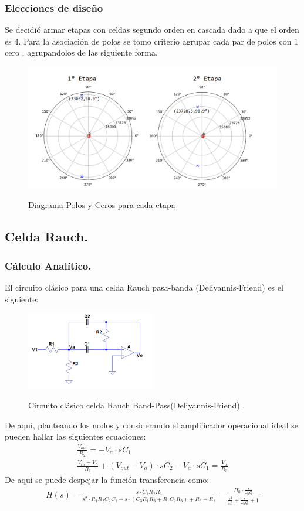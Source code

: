 \subsubsection{Elecciones de diseño}
Se decidió armar etapas con celdas segundo orden en cascada dado a que el orden es 4.
Para la asociación de polos se tomo criterio agrupar cada par de polos con 1 cero , agrupandolos de las siguiente forma.
\begin{figure}[H]
	\centering
	\includegraphics[width=\textwidth]{Imagenes-Ej2/UnionCeros.png}
	\label{fig:CeroPoleUnion}
	\caption{Diagrama Polos y Ceros para cada etapa}
\end{figure}

\subsection{Celda Rauch.}
\subsubsection{Cálculo Analítico.}
El circuito clásico para una celda 	Rauch pasa-banda (Deliyannis-Friend) es el siguiente:
\begin{figure}[H]
	\centering
	\includegraphics[width=0.5\textwidth]{Imagenes-Ej2/rauchoriginal.PNG}
	\label{fig:graph}
	\caption{Circuito clásico celda Rauch Band-Pass(Deliyannis-Friend) .}
\end{figure}
De aquí, planteando los nodos y considerando el amplificador operacional ideal se pueden hallar las siguientes ecuaciones:
\begin{align}
\frac{V_{out}}{R_2}=-V_a\cdot sC_1\\ 
\frac{V_{in}-V_a}{R_1}+(V_{out}-V_a)\cdot sC_2 -V_a \cdot sC_1 = \frac{V_a}{R_3}
\end{align}
De aqui se puede despejar la función transferencia como:
\begin{align}
H(s)=\frac{s \cdot C_1R_2R_3}{s^2\cdot R_1R_2C_2C_1+s\cdot (C_3R_1R_3+R_1C_2R_3)+R_3+R_1}=\frac{H_0 \cdot \frac{s}{\omega_0 Q}}{\frac{s^2}{\omega_0^2}+\frac{s}{\omega_0Q}+1}
\end{align}

